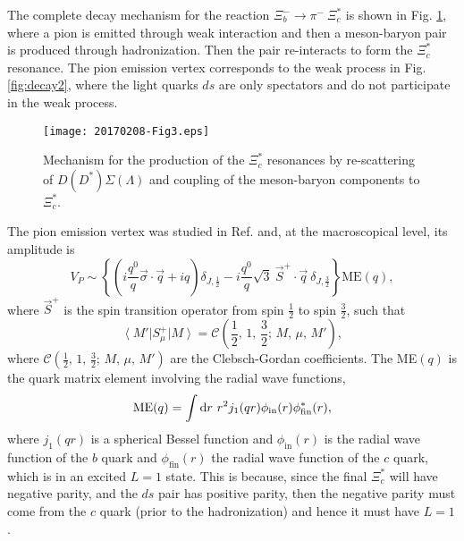 \documentclass{PoS}
\begin{document}
The complete decay mechanism for the reaction $\Xi_b^- \to \pi^- \ \Xi_c^*$ is shown in Fig. \ref{fig:decay3}, where a pion is emitted through weak interaction and then a meson-baryon pair is produced through hadronization. Then the pair re-interacts to form the $\Xi_c^*$ resonance. The pion emission vertex corresponds to the weak process in Fig. \ref{fig:decay2}, where the light quarks $ds$ are only spectators and do not participate in the weak process.

\begin{figure}[h!]
  \centering
  \texttt{[image: 20170208-Fig3.eps]}
  \caption{Mechanism for the production of the $\Xi_c^*$ resonances by re-scattering of  $D \left(D^* \right) \Sigma \left(\Lambda\right)$ and coupling of the meson-baryon components to  $\Xi_c^*$.}
  \label{fig:decay3}
\end{figure}

The pion emission vertex was studied in Ref. \cite{weihong} and, at the macroscopical level, its amplitude is
\begin{equation}
\label{Eq:13}
V_P \sim \left\{ \left(i \frac{q^0}{q} \vec{\sigma} \cdot \vec{q} + i q \right) \delta_{J,\frac{1}{2}}-i \frac{q^0}{q} \sqrt{3} \ \vec{S}^+ \cdot \vec{q} \ \delta_{J,\frac{3}{2}} \right\} \text{ME}(q),
\end{equation}
where $\vec{S}^+$ is the spin transition operator from spin $\frac{1}{2}$ to spin $\frac{3}{2}$, such that
\begin{equation}
\left < M' \right| S^+_{\mu} \left| M \right> = \mathcal{C}(\frac{1}{2}, \, 1, \, \frac{3}{2};\, M, \, \mu, \, M'),
\end{equation}
where $\mathcal{C}(\frac{1}{2}, \, 1, \, \frac{3}{2};\, M, \, \mu, \, M')$ are the Clebsch-Gordan coefficients. The ME$(q)$ is the quark matrix element involving the radial wave functions,
\begin{equation}
\label{Eq.:matel}
\text{ME}(q)=\int {\rm d}r \ r^2 j_1(qr) \phi_{\text{in}}(r) \phi^*_{\text{fin}}(r),
\end{equation}
where $j_1(qr)$ is a spherical Bessel function and $\phi_{\text{in}}(r)$ is the radial wave function of the $b$ quark and $\phi_{\text{fin}}(r)$ the radial wave function of the $c$ quark, which is in an excited $L=1$ state. This is because, since the final $\Xi_c^*$ will have negative parity, and the $ds$ pair has positive parity, then the negative parity must come from the $c$ quark (prior to the hadronization) and hence it must have $L=1$.
\end{document}
